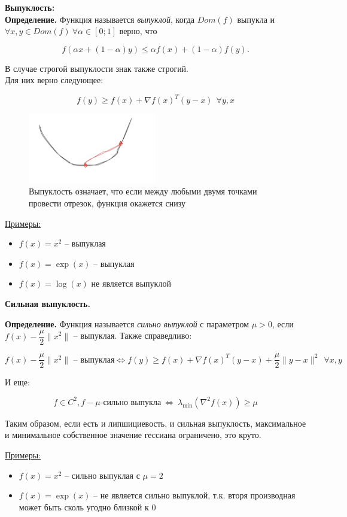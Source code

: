 \textbf{Выпуклость:}\\
\textbf{Определение.} Функция называется \textit{выпуклой}, когда $Dom(f)$ выпукла и $\forall x, y \in Dom(f)\   \forall \alpha \in [0; 1]$ верно, что

$$f(\alpha x + (1 - \alpha)y) \leq \alpha f(x) + (1 - \alpha) f(y).$$

В случае строгой выпуклости знак также строгий.\\
Для них верно следующее:

$$f(y) \geq f(x) + \nabla f(x)^T(y-x)\ \ \forall y, x$$

\begin{figure}[H]
    \centering
    \includegraphics[width=0.5\textwidth]{images/conv.png}
    \caption{Выпуклость означает, что если между любыми двумя точками провести отрезок, функция окажется снизу}
\end{figure}

\underline{Примеры:}
\begin{itemize}
    \item $f(x) = x^2$ -- выпуклая
    \item $f(x) = \exp(x)$ -- выпуклая
    \item $f(x) = \log(x)$ не является выпуклой
\end{itemize}
\bigskip



\textbf{Сильная выпуклость.}

\textbf{Определение.} Функция называется \textit{сильно выпуклой} с параметром $\mu > 0$, если $f(x) - \dfrac{\mu}{2}\|x^2\|$ -- выпуклая.
Также справедливо:

$$f(x) - \dfrac{\mu}{2}\|x^2\|\text{ -- выпуклая} \Leftrightarrow f(y) \geq f(x) + \nabla f(x)^T(y-x) + \dfrac{\mu}{2}\|y-x\|^2\ \ \forall x, y$$

И еще:

$$f\in C^2, f - \mu\text{-сильно выпукла}\ \Leftrightarrow\ \lambda_{\min}(\nabla^2 f(x)) \geq \mu$$

Таким образом, если есть и липшициевость, и сильная выпуклость, максимальное и минимальное собственное значение гессиана ограничено, это круто.

\underline{Примеры:}
\begin{itemize}
    \item $f(x) = x^2$ -- сильно выпуклая с $\mu = 2$
    \item $f(x) = \exp(x)$ -- не является сильно выпуклой, т.к. вторя производная может быть сколь угодно близкой к 0
\end{itemize}